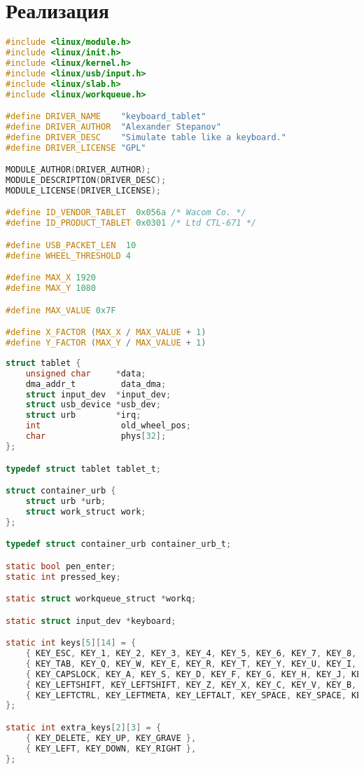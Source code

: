 \chapter{Реализация}

\begin{lstlisting}[language=c,caption=Объявление начальных макросов,label=lst:macros]
#include <linux/module.h>
#include <linux/init.h>
#include <linux/kernel.h>
#include <linux/usb/input.h>
#include <linux/slab.h>
#include <linux/workqueue.h>

#define DRIVER_NAME    "keyboard_tablet"
#define DRIVER_AUTHOR  "Alexander Stepanov"
#define DRIVER_DESC    "Simulate table like a keyboard."
#define DRIVER_LICENSE "GPL"

MODULE_AUTHOR(DRIVER_AUTHOR);
MODULE_DESCRIPTION(DRIVER_DESC);
MODULE_LICENSE(DRIVER_LICENSE);

#define ID_VENDOR_TABLET  0x056a /* Wacom Co. */
#define ID_PRODUCT_TABLET 0x0301 /* Ltd CTL-671 */

#define USB_PACKET_LEN  10
#define WHEEL_THRESHOLD 4

#define MAX_X 1920
#define MAX_Y 1080

#define MAX_VALUE 0x7F

#define X_FACTOR (MAX_X / MAX_VALUE + 1)
#define Y_FACTOR (MAX_Y / MAX_VALUE + 1)
\end{lstlisting}

\begin{lstlisting}[language=c,caption=Объявление структур и глобальных переменных,label=lst:structs]
struct tablet {
    unsigned char     *data;
    dma_addr_t         data_dma;
    struct input_dev  *input_dev;
    struct usb_device *usb_dev;
    struct urb        *irq;
    int                old_wheel_pos;
    char               phys[32];
};

typedef struct tablet tablet_t;

struct container_urb {
    struct urb *urb;
    struct work_struct work;
};

typedef struct container_urb container_urb_t;

static bool pen_enter;
static int pressed_key;

static struct workqueue_struct *workq;

static struct input_dev *keyboard;

static int keys[5][14] = {
    { KEY_ESC, KEY_1, KEY_2, KEY_3, KEY_4, KEY_5, KEY_6, KEY_7, KEY_8, KEY_9, KEY_0, KEY_MINUS, KEY_EQUAL, KEY_BACKSPACE },
    { KEY_TAB, KEY_Q, KEY_W, KEY_E, KEY_R, KEY_T, KEY_Y, KEY_U, KEY_I, KEY_O, KEY_P, KEY_LEFTBRACE, KEY_RIGHTBRACE, KEY_BACKSLASH },
    { KEY_CAPSLOCK, KEY_A, KEY_S, KEY_D, KEY_F, KEY_G, KEY_H, KEY_J, KEY_K, KEY_L, KEY_SEMICOLON, KEY_APOSTROPHE, KEY_ENTER },
    { KEY_LEFTSHIFT, KEY_LEFTSHIFT, KEY_Z, KEY_X, KEY_C, KEY_V, KEY_B, KEY_N, KEY_M, KEY_COMMA, KEY_DOT, KEY_SLASH, KEY_RIGHTSHIFT, KEY_RIGHTSHIFT },
    { KEY_LEFTCTRL, KEY_LEFTMETA, KEY_LEFTALT, KEY_SPACE, KEY_SPACE, KEY_SPACE, KEY_SPACE, KEY_SPACE, KEY_SPACE, KEY_SPACE, KEY_RIGHTALT, 0, 0, KEY_RIGHTCTRL },
};

static int extra_keys[2][3] = {
    { KEY_DELETE, KEY_UP, KEY_GRAVE },
    { KEY_LEFT, KEY_DOWN, KEY_RIGHT },
};
\end{lstlisting}

